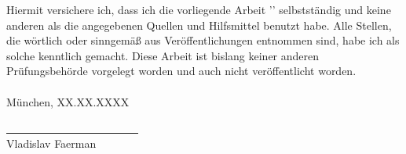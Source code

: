
Hiermit versichere ich, dass ich die vorliegende Arbeit '\themaT' selbstständig und keine anderen als die angegebenen Quellen und Hilfsmittel benutzt habe. Alle Stellen, die wörtlich oder sinngemäß aus Veröffentlichungen entnommen sind, habe ich als solche kenntlich gemacht. Diese Arbeit ist bislang keiner anderen Prüfungsbehörde vorgelegt worden und auch nicht veröffentlicht worden.
\\\\München, XX.XX.XXXX

\vskip 1.5cm

\underline{~~~~~~~~~~~~~~~~~~~~~~~~}\\
Vladislav Faerman\\